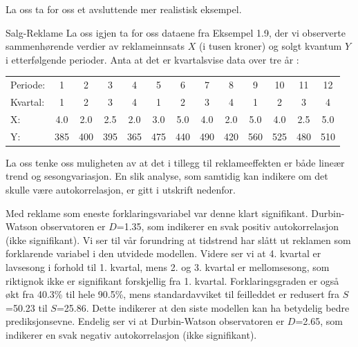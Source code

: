 La oss ta for oss et avsluttende mer realistisk eksempel.\\

\begin{eksempel}{Salg-Reklame}
La oss igjen ta for oss dataene fra Eksempel 1.9, der vi observerte
sammenhørende verdier av reklameinnsats $X$ (i tusen kroner) og solgt
kvantum $Y$ i etterfølgende perioder. Anta at det er kvartalsvise data
over tre år :
 \begin{center} \small \addtolength{\tabcolsep}{-0.4\tabcolsep}
  \begin{tabular}{lcccccccccccc}
  Periode:  & 1&2&3&4&5&6&7&8&9&10&11&12 \\
  Kvartal: & 1&2&3&4&1&2&3&4&1&2&3&4 \\
       X: & 4.0&2.0&2.5&2.0&3.0&5.0&4.0&2.0&5.0&4.0&2.5&5.0 \\
       Y: &385&400&395&365&475&440&490&420&560&525&480&510 \\
  \end{tabular}
 \end{center}
La oss tenke oss muligheten av at det i tillegg til reklameeffekten er både
lineær trend og sesongvariasjon. En slik analyse, som samtidig kan 
indikere om det skulle være autokorrelasjon, er gitt i utskrift nedenfor.

Med reklame som eneste forklaringsvariabel var denne klart signifikant.
Durbin-Watson observatoren er $D$=1.35, som indikerer en
svak positiv autokorrelasjon (ikke signifikant).
Vi ser til vår forundring at tidstrend har slått ut reklamen
som for\-kla\-rende variabel i den utvidede modellen. Videre ser vi at
4. kvartal er lavsesong i forhold til 1. kvartal, mens 2. og 3. kvartal er
mellomsesong, som riktignok ikke er signifikant forskjellig fra 1. kvartal.
Forklaringsgraden er også økt fra 40.3\% til hele 90.5\%, mens
standardavviket til feilleddet er redusert fra $S$=50.23 til $S$=25.86.
Dette indikerer at den siste modellen kan ha betydelig bedre prediksjonsevne.
Endelig ser vi at Durbin-Watson observatoren er $D$=2.65, som indikerer en
svak negativ autokorrelasjon (ikke signifikant).


\end{eksempel}
